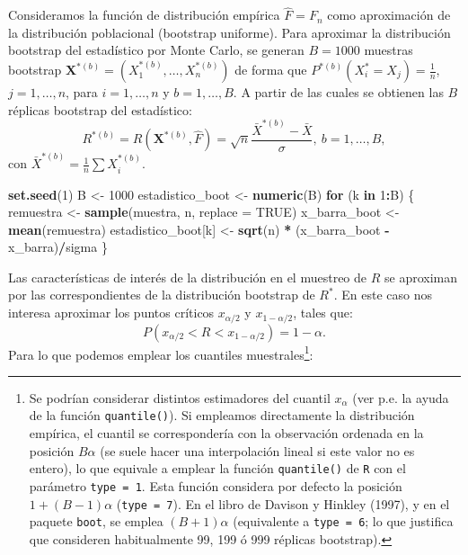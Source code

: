\documentclass[
]{book}
\newenvironment{Shaded}{\begin{snugshade}}{\end{snugshade}}
\newcommand{\ControlFlowTok}[1]{\textcolor[rgb]{0.13,0.29,0.53}{\textbf{#1}}}
\newcommand{\DataTypeTok}[1]{\textcolor[rgb]{0.13,0.29,0.53}{#1}}
\newcommand{\DecValTok}[1]{\textcolor[rgb]{0.00,0.00,0.81}{#1}}
\newcommand{\KeywordTok}[1]{\textcolor[rgb]{0.13,0.29,0.53}{\textbf{#1}}}
\newcommand{\NormalTok}[1]{#1}
\newcommand{\OperatorTok}[1]{\textcolor[rgb]{0.81,0.36,0.00}{\textbf{#1}}}
\newcommand{\OtherTok}[1]{\textcolor[rgb]{0.56,0.35,0.01}{#1}}
\newcommand{\StringTok}[1]{\textcolor[rgb]{0.31,0.60,0.02}{#1}}
\theoremstyle{definition}
\theoremstyle{definition}
\theoremstyle{definition}
\theoremstyle{remark}
\begin{document}
Consideramos la función de distribución empírica \(\hat{F}=F_n\)
como aproximación de la distribución poblacional (bootstrap uniforme).
Para aproximar la distribución bootstrap del estadístico por Monte Carlo,
se generan \(B=1000\) muestras bootstrap
\(\mathbf{X}^{\ast (b)}=\left( X_1^{\ast (b)},\ldots ,X_n^{\ast (b)} \right)\)
de forma que
\(P^{\ast (b)}\left( X_i^{\ast}=X_j \right) = \frac{1}{n}\), \(j=1,\ldots ,n\), para \(i=1,\ldots, n\) y \(b=1,\ldots, B\).
A partir de las cuales se obtienen las \(B\) réplicas bootstrap del estadístico:
\[R^{\ast (b)}=R\left( \mathbf{X}^{\ast (b)},\hat{F} \right) =\sqrt{n}\frac{
\bar{X}^{\ast  (b)}-\bar{X}}{\sigma }, \ b=1,\ldots, B, \]
con \(\bar{X}^{\ast (b)} = \frac{1}{n}\sum X_i^{\ast (b)}\).

\begin{Shaded}
\begin{Highlighting}[]
\KeywordTok{set.seed}\NormalTok{(}\DecValTok{1}\NormalTok{)}
\NormalTok{B <-}\StringTok{ }\DecValTok{1000}
\NormalTok{estadistico_boot <-}\StringTok{ }\KeywordTok{numeric}\NormalTok{(B)}
\ControlFlowTok{for}\NormalTok{ (k }\ControlFlowTok{in} \DecValTok{1}\OperatorTok{:}\NormalTok{B) \{}
\NormalTok{    remuestra <-}\StringTok{ }\KeywordTok{sample}\NormalTok{(muestra, n, }\DataTypeTok{replace =} \OtherTok{TRUE}\NormalTok{)}
\NormalTok{    x_barra_boot <-}\StringTok{ }\KeywordTok{mean}\NormalTok{(remuestra)}
\NormalTok{    estadistico_boot[k] <-}\StringTok{ }\KeywordTok{sqrt}\NormalTok{(n) }\OperatorTok{*}\StringTok{ }\NormalTok{(x_barra_boot }\OperatorTok{-}\StringTok{ }\NormalTok{x_barra)}\OperatorTok{/}\NormalTok{sigma}
\NormalTok{\}}
\end{Highlighting}
\end{Shaded}

Las características de interés de la distribución en el muestreo de \(R\)
se aproximan por las correspondientes de la distribución bootstrap de \(R^{\ast}\).
En este caso nos interesa aproximar los puntos críticos \(x_{\alpha /2}\) y
\(x_{1-\alpha /2}\), tales que:
\[P\left( x_{\alpha /2} < R < x_{1-\alpha /2} \right) = 1-\alpha.\]
Para lo que podemos emplear los cuantiles muestrales\footnote{Se podrían considerar distintos estimadores del cuantil \(x_{\alpha}\)
  (ver p.e. la ayuda de la función \texttt{quantile()}).
  Si empleamos directamente la distribución empírica, el cuantil se
  correspondería con la observación ordenada en la posición \(B \alpha\)
  (se suele hacer una interpolación lineal si este valor no es entero),
  lo que equivale a emplear la función \texttt{quantile()} de \texttt{R} con el parámetro
  \texttt{type\ =\ 1}. Esta función considera por defecto la posición
  \(1 + (B - 1) \alpha\) (\texttt{type\ =\ 7}).
  En el libro de Davison y Hinkley (1997), y en el paquete \texttt{boot}, se emplea \((B + 1) \alpha\) (equivalente a \texttt{type\ =\ 6}; lo que justifica que
  consideren habitualmente 99, 199 ó 999 réplicas bootstrap).}:
\end{document}
